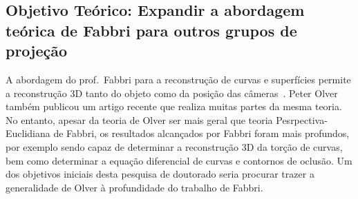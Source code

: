 \documentclass[a4paper,titlepage]{article}
\begin{document}
\subsection{Objetivo Teórico: Expandir a abordagem teórica de Fabbri para outros
grupos de projeção}

A abordagem do prof.\ Fabbri para a reconstrução de curvas e superfícies permite
a reconstrução 3D tanto do objeto como da posição das
câmeras~\cite{fabbri2016multiview}. Peter Olver também publicou um
artigo recente que realiza muitas partes da mesma teoria. No entanto, apesar da
teoria de Olver ser mais geral que teoria Pesrpectiva-Euclidiana de Fabbri, os resultados
alcançados por Fabbri foram mais profundos, por exemplo sendo capaz de
determinar a reconstrução 3D da torção de curvas, bem como determinar a equação
diferencial de curvas e contornos de oclusão. Um dos objetivos iniciais desta
pesquisa de doutorado seria procurar trazer a generalidade de Olver à
profundidade do trabalho de Fabbri.
\end{document}
